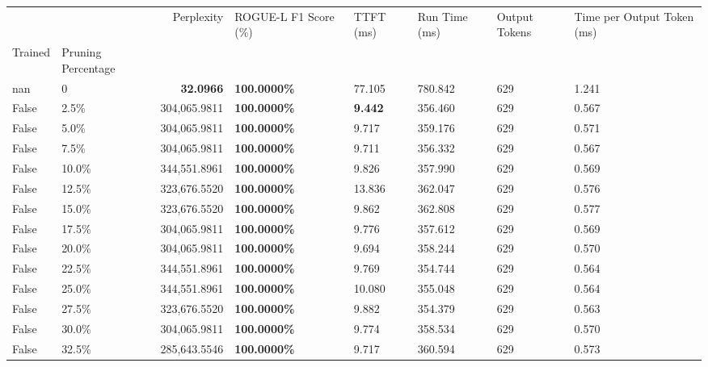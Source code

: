 \begin{table}[H]
\label{tab:evaluation-pipeline-1-untrained}
\begin{tabular}{|m{}| m{}| r | R{0.13\textwidth}| R{0.09\textwidth}| R{0.09\textwidth}| R{0.09\textwidth}| R{0.11\textwidth} |}
\toprule
 &  & Perplexity & ROGUE-L F1 Score (\%) & TTFT (ms) & Run Time (ms) & Output Tokens & Time per Output Token (ms) \\
Trained & Pruning Percentage &  &  &  &  &  &  \\
\midrule
nan & 0 & \bfseries 32.0966 & \bfseries 100.0000\% & 77.105 & 780.842 & 629 & 1.241 \\
False & 2.5\% & 304,065.9811 & \bfseries \color{red} 100.0000\% & \bfseries \color{red} 9.442 & 356.460 & 629 & 0.567 \\
False & 5.0\% & 304,065.9811 & \bfseries \color{red} 100.0000\% & 9.717 & 359.176 & 629 & 0.571 \\
False & 7.5\% & 304,065.9811 & \bfseries \color{red} 100.0000\% & 9.711 & 356.332 & 629 & 0.567 \\
False & 10.0\% & 344,551.8961 & \bfseries \color{red} 100.0000\% & 9.826 & 357.990 & 629 & 0.569 \\
False & 12.5\% & 323,676.5520 & \bfseries \color{red} 100.0000\% & 13.836 & 362.047 & 629 & 0.576 \\
False & 15.0\% & 323,676.5520 & \bfseries \color{red} 100.0000\% & 9.862 & 362.808 & 629 & 0.577 \\
False & 17.5\% & 304,065.9811 & \bfseries \color{red} 100.0000\% & 9.776 & 357.612 & 629 & 0.569 \\
False & 20.0\% & 304,065.9811 & \bfseries \color{red} 100.0000\% & 9.694 & 358.244 & 629 & 0.570 \\
False & 22.5\% & 344,551.8961 & \bfseries \color{red} 100.0000\% & 9.769 & 354.744 & 629 & 0.564 \\
False & 25.0\% & 344,551.8961 & \bfseries \color{red} 100.0000\% & 10.080 & 355.048 & 629 & 0.564 \\
False & 27.5\% & 323,676.5520 & \bfseries \color{red} 100.0000\% & 9.882 & 354.379 & 629 & 0.563 \\
False & 30.0\% & 304,065.9811 & \bfseries \color{red} 100.0000\% & 9.774 & 358.534 & 629 & 0.570 \\
False & 32.5\% & \color{red} 285,643.5546 & \bfseries \color{red} 100.0000\% & 9.717 & 360.594 & 629 & 0.573 \\

\end{tabular}
\end{table}
